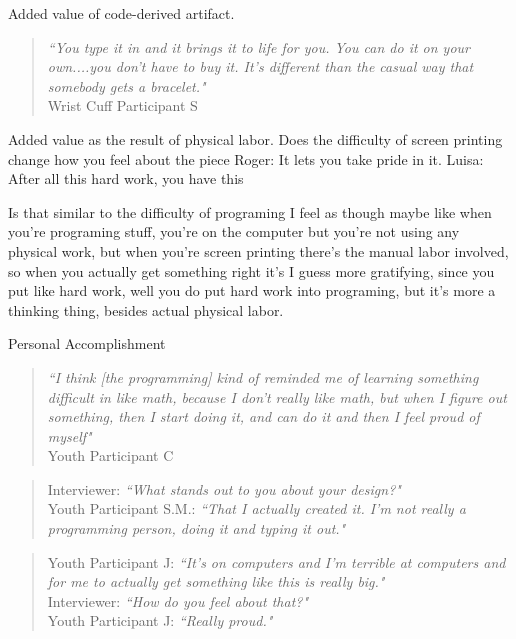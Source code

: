 \documentclass{sigchi}
\begin{document}
Added value of code-derived artifact.\\
 \begin{quotation}
\textit{``You type it in and it brings it to life for you. You can do it on your own....you don't have to buy it. It's different than the casual way that somebody gets a bracelet."}
\\Wrist Cuff Participant S
 \end{quotation}
Added value as the result of physical labor.
Does the difficulty of screen printing change how you feel about the piece
Roger: It lets you take pride in it.
Luisa: After all this hard work, you have this	

Is that similar to the difficulty of programing
I feel as though maybe like when you're programing stuff, you're on the computer but you're not using any physical work, but when you're screen printing there's the manual labor involved, so when you actually get something right it's I guess more gratifying, since you put like hard work, well you do put hard work into programing, but it's more a thinking thing, besides actual physical labor.


Personal Accomplishment
\begin{quotation}
 \textit{``I think [the programming] kind of reminded me of learning something difficult in like math, because I don't really like math, but when I figure out something, then I start doing it, and can do it and then I feel proud of myself"}
 \\Youth Participant C
\end{quotation}

 \begin{quotation}
 Interviewer:  \textit{``What stands out to you about your design?"}
 \\Youth Participant S.M.: \textit{``That I actually created it. I'm not really a programming person, doing it and typing it out."}
 \end{quotation}
 
 \begin{quotation}
Youth Participant J: \textit{``It's on computers and I'm terrible at computers and for me to actually get something like this is really big."} 
\\Interviewer:  \textit{``How do you feel about that?"}
\\Youth Participant J:  \textit{``Really proud."}	
\end{quotation}
\end{document}
